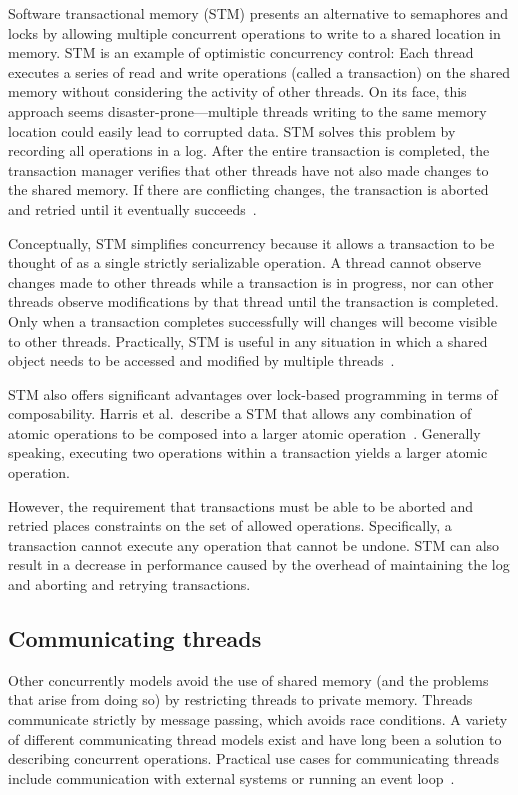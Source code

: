\documentclass{sig-alternate}
\begin{document}
Software transactional memory (STM) presents an alternative to semaphores and locks by allowing multiple concurrent operations to write to a shared location in memory. STM is an example of optimistic concurrency control: Each thread executes a series of read and write operations (called a transaction) on the shared memory without considering the activity of other threads. On its face, this approach seems disaster-prone---multiple threads writing to the same memory location could easily lead to corrupted data. STM solves this problem by recording all operations in a log. After the entire transaction is completed, the transaction manager verifies that other threads have not also made changes to the shared memory. If there are conflicting changes, the transaction is aborted and retried until it eventually succeeds~\cite{Shavit1995}.

Conceptually, STM simplifies concurrency because it allows a transaction to be thought of as a single strictly serializable operation. A thread cannot observe changes made to other threads while a transaction is in progress, nor can other threads observe modifications by that thread until the transaction is completed. Only when a transaction completes successfully will changes will become visible to other threads. Practically, STM is useful in any situation in which a shared object needs to be accessed and modified by multiple threads~\cite{Swalens2014}.

STM also offers significant advantages over lock-based programming in terms of composability. Harris et al.\ describe a STM that allows any combination of atomic operations to be composed into a larger atomic operation~\cite{Harris2005}. Generally speaking, executing two operations within a transaction yields a larger atomic operation.

However, the requirement that transactions must be able to be aborted and retried places constraints on the set of allowed operations. Specifically, a transaction cannot execute any operation that cannot be undone. STM can also result in a decrease in performance caused by the overhead of maintaining the log and aborting and retrying transactions.

\subsection{Communicating threads}

Other concurrently models avoid the use of shared memory (and the problems that arise from doing so) by restricting threads to private memory. Threads communicate strictly by message passing, which avoids race conditions. A variety of different communicating thread models exist and have long been a solution to describing concurrent operations. Practical use cases for communicating threads include communication with external systems or running an event loop~\cite{Swalens2014}.
\end{document}
